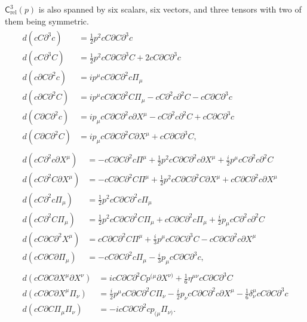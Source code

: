 \documentclass[11pt,reqno,a4paper,final]{amsart}
\theoremstyle{plain}
\theoremstyle{definition}
\renewcommand{\d}{\partial}
\newcommand{\Crel}{\mathsf{C}_{\mathrm{rel}}} %
\newcommand{\1}{\mathbb{1}}
\numberwithin{equation}{section}
\begin{document}
\begin{appendices}
$\Crel^3(p)$ is also spanned by six scalars, six vectors, and three tensors with two of them being symmetric.
\begin{align}      
  \begin{split} \label{eq:d-on-scalars-gh-no-3}
    d(c C \d^3 c) &= \tfrac12 p^2 c C \d C \d^3 c\\
    d(c C \d^3 C) &= \tfrac12 p^2 c C \d C \d^3 C + 2 c C \d C \d^3 c\\
    d(c \d C \d^2 c) &= i p^\mu c C \d C \d^2 c \Pi_\mu\\
    d(c \d C \d^2 C) &= i p^\mu c C \d C \d^2 C \Pi_\mu - c C \d^2 c \d^2 C - c C \d C \d^3 c\\
    d(C \d C \d^2 c) &= i p_\mu c C \d C \d^2 c \d X^\mu - c C \d^2 c \d^2 C + c C \d C \d^3 c\\
    d(C \d C \d^2 C) &= i p_\mu c C \d C \d^2 C \d X^\mu + c C \d C \d^3 C,    
  \end{split}\\[1ex]
  \begin{split}     \label{eq:d-on-vectors-gh-no-3}
    d (c C \d^2 c \d X^\mu) &= - c C \d C \d^2 c \Pi^\mu + \tfrac12 p^2 c C \d C \d^2 c \d X^\mu + \tfrac{i}2 p^\mu c C \d^2 c \d^2 C\\
    d (c C \d^2 C \d X^\mu) &= - c C \d C \d^2 C \Pi^\mu + \tfrac12 p^2 c C \d C \d^2 C \d X^\mu + c C \d C \d^2 c \d X^\mu\\
    d (c C \d^2 c \Pi_\mu) &= \tfrac12 p^2 c C \d C \d^2 c \Pi_\mu\\
    d (c C \d^2 C \Pi_\mu) &= \tfrac12 p^2 c C \d C \d^2 C \Pi_\mu + c C \d C \d^2 c \Pi_\mu + \tfrac{i}2 p_\mu c C \d^2 c \d^2 C\\
    d (c C \d C \d^2 X^\mu) &= c C \d C \d^2 C \Pi^\mu + \tfrac{i}3 p^\mu c C \d C \d^3 C - c C \d C \d^2 c \d X^\mu\\
    d (c C \d C \d \Pi_\mu) &= - c C \d C \d^2 c \Pi_\mu - \tfrac{i}3 p_\mu c C \d C \d^3 c,
  \end{split}\\[1ex]
  \begin{split}     \label{eq:d-on-tensors-gh-no-3}
    d (c C \d C \d X^\mu \d X^\nu) &= i c C \d C \d^2 C p^{(\mu} \d X^{\nu)} + \tfrac16 \eta^{\mu\nu} c C \d C \d^3 C\\
    d (c C \d C \d X^\mu \Pi_\nu) &= \tfrac{i}2 p^\mu c C \d C \d^2 C \Pi_\nu - \tfrac{i}2 p_\nu c C \d C \d^2 c \d X^\mu - \tfrac16 \delta^\mu_\nu c C \d C \d^3 c\\
    d (c C \d C \Pi_\mu \Pi_\nu) &= -i c C \d C \d^2 c p_{(\mu} \Pi_{\nu)}.
  \end{split}
\end{align}


\end{appendices}
\end{document}
